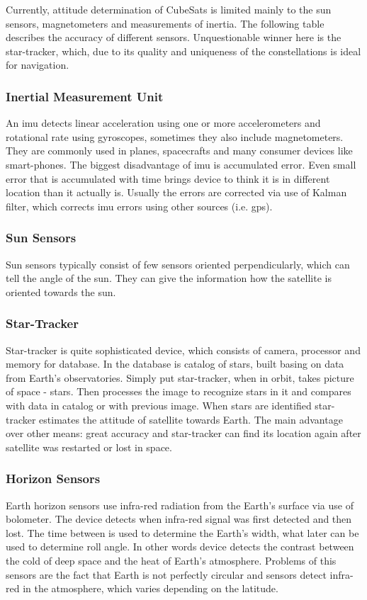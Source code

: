 \documentclass[12pt,a4paper,twoside]{article}
\begin{document}
Currently, attitude determination of CubeSats is limited mainly to the sun sensors, magnetometers and measurements of inertia. The following table describes the accuracy of different sensors. Unquestionable winner here is the star-tracker, which, due to its quality and uniqueness of the constellations is ideal for navigation. 

\subsubsection{Inertial Measurement Unit}
An \gls{imu} detects linear acceleration using one or more accelerometers and rotational rate using gyroscopes, sometimes they also include magnetometers. They are commonly used in planes, spacecrafts and many consumer devices like smart-phones. The biggest disadvantage of \gls{imu} is accumulated error. Even small error that is accumulated with time brings device to think it is in different location than it actually is. Usually the errors are corrected via use of Kalman filter, which corrects \gls{imu} errors using other sources (i.e. \gls{gps}).
\subsubsection{Sun Sensors}
Sun sensors typically consist of few sensors oriented perpendicularly, which can tell the angle of the sun. They can give the information how the satellite is oriented towards the sun.
\subsubsection{Star-Tracker}
Star-tracker is quite sophisticated device, which consists of camera, processor and memory for database. In the database is catalog of stars, built basing on data from Earth's observatories. Simply put star-tracker, when in orbit, takes picture of space - stars. Then processes the image to recognize stars in it and compares with data in catalog or with previous image. When stars are identified star-tracker estimates the attitude of satellite towards Earth. The main advantage over other means: great accuracy and star-tracker can find its location again after satellite was restarted or lost in space.
\subsubsection{Horizon Sensors}
Earth horizon sensors use infra-red radiation from the Earth's surface via use of bolometer. The device detects when infra-red signal was first detected and then lost. The time between is used to determine the Earth's width, what later can be used to determine roll angle. In other words device detects the contrast between the cold of deep space and the heat of Earth's atmosphere. Problems of this sensors are the fact that Earth is not perfectly circular and sensors detect infra-red in the atmosphere, which varies depending on the latitude.
\end{document}
